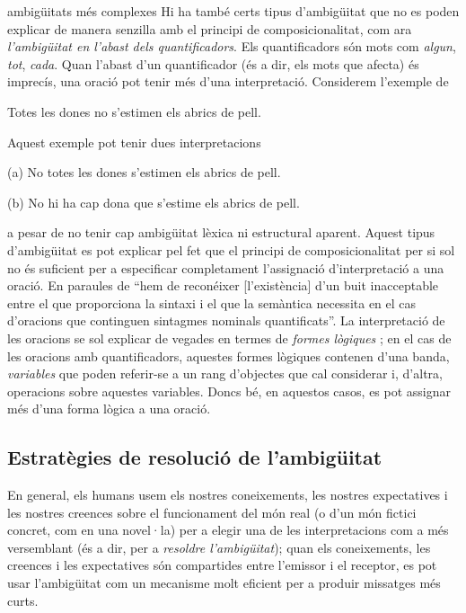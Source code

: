 \begin{persabermes}{ambigüitats més complexes}
  Hi ha també certs tipus d'ambigüitat que no es poden explicar de
  manera senzilla amb el principi de composicionalitat, com ara {\em
    l'ambigüitat en l'abast dels quantificadors}. Els quantificadors
  són mots com \emph{algun}, \emph{tot}, \emph{cada}.  Quan l'abast
  d'un quantificador (és a dir, els mots que afecta) és imprecís, una
  oració pot tenir més d'una interpretació. Considerem l'exemple de
  \cite{hutchins92b}
  \begin{exemple}
    Totes les dones no s'estimen els abrics de pell.
    \label{eq:abric}
  \end{exemple}
  Aquest exemple pot tenir dues interpretacions
  \begin{exemple}
  \item[(a)] No totes les dones s'estimen els abrics de pell.
  \item[(b)] No hi ha cap dona que s'estime els abrics de pell.
  \end{exemple}
  a pesar de no tenir cap ambigüitat lèxica ni estructural aparent.
  Aquest tipus d'ambigüitat es pot explicar pel fet que el principi de
  composicionalitat per si sol no és suficient per a especificar
  completament l'assignació d'interpretació a una oració. En paraules
  de \citet[p.~364]{radford99b} ``hem de reconéixer [l'existència]
  d'un buit inacceptable entre el que proporciona la sintaxi i el que
  la semàntica necessita en el cas d'oracions que continguen sintagmes
  nominals quantificats''. La interpretació de les oracions se sol
  explicar de vegades en termes de {\em formes lògiques}
  \citep[cap.~23]{radford09b}; en el cas de les oracions amb
  quantificadors, aquestes formes lògiques contenen d'una banda,
  \emph{variables} que poden referir-se a un rang d'objectes que cal
  considerar i, d'altra, operacions sobre aquestes variables.  Doncs
  bé, en aquestos casos, es pot assignar més d'una forma lògica a una
  oració.
\end{persabermes}

\subsection{Estratègies de resolució de l'ambigüitat}
En general, els humans usem els nostres coneixements, les nostres
expectatives i les nostres creences sobre el funcionament del món real
(o d'un món fictici concret, com en una novel·la) per a elegir una de
les interpretacions com a més versemblant (és a dir, per a
\emph{resoldre l'ambigüitat}); quan els coneixements, les creences i
les expectatives són compartides entre l'emissor i el receptor, es pot
usar l'ambigüitat com un mecanisme molt eficient per a produir
missatges més curts.

